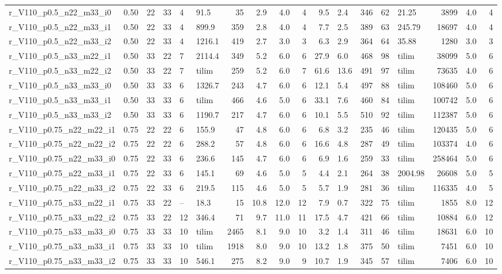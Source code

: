 \begin{tabular}{lrrrllrrrrrlrllrrr}
r_V110_p0.5_n22_m33_i0 & 0.50 & 22 & 33 & 4 & 91.5 & 35 & 2.9 & 4.0 & 4 & 9.5 & 2.4 & 346 & 62 & 21.25 & 3899 & 4.0 & 4 \\
r_V110_p0.5_n22_m33_i1 & 0.50 & 22 & 33 & 4 & 899.9 & 359 & 2.8 & 4.0 & 4 & 7.7 & 2.5 & 389 & 63 & 245.79 & 18697 & 4.0 & 4 \\
r_V110_p0.5_n22_m33_i2 & 0.50 & 22 & 33 & 4 & 1216.1 & 419 & 2.7 & 3.0 & 3 & 6.3 & 2.9 & 364 & 64 & 35.88 & 1280 & 3.0 & 3 \\
r_V110_p0.5_n33_m22_i1 & 0.50 & 33 & 22 & 7 & 2114.4 & 349 & 5.2 & 6.0 & 6 & 27.9 & 6.0 & 468 & 98 & tilim & 38099 & 5.0 & 6 \\
r_V110_p0.5_n33_m22_i2 & 0.50 & 33 & 22 & 7 & tilim & 259 & 5.2 & 6.0 & 7 & 61.6 & 13.6 & 491 & 97 & tilim & 73635 & 4.0 & 6 \\
r_V110_p0.5_n33_m33_i0 & 0.50 & 33 & 33 & 6 & 1326.7 & 243 & 4.7 & 6.0 & 6 & 12.1 & 5.4 & 497 & 88 & tilim & 108460 & 5.0 & 6 \\
r_V110_p0.5_n33_m33_i1 & 0.50 & 33 & 33 & 6 & tilim & 466 & 4.6 & 5.0 & 6 & 33.1 & 7.6 & 460 & 84 & tilim & 100742 & 5.0 & 6 \\
r_V110_p0.5_n33_m33_i2 & 0.50 & 33 & 33 & 6 & 1190.7 & 217 & 4.7 & 6.0 & 6 & 10.1 & 5.5 & 510 & 92 & tilim & 112387 & 5.0 & 6 \\
r_V110_p0.75_n22_m22_i1 & 0.75 & 22 & 22 & 6 & 155.9 & 47 & 4.8 & 6.0 & 6 & 6.8 & 3.2 & 235 & 46 & tilim & 120435 & 5.0 & 6 \\
r_V110_p0.75_n22_m22_i2 & 0.75 & 22 & 22 & 6 & 288.2 & 57 & 4.8 & 6.0 & 6 & 16.6 & 4.8 & 287 & 49 & tilim & 103374 & 4.0 & 6 \\
r_V110_p0.75_n22_m33_i0 & 0.75 & 22 & 33 & 6 & 236.6 & 145 & 4.7 & 6.0 & 6 & 6.9 & 1.6 & 259 & 33 & tilim & 258464 & 5.0 & 6 \\
r_V110_p0.75_n22_m33_i1 & 0.75 & 22 & 33 & 6 & 145.1 & 69 & 4.6 & 5.0 & 5 & 4.4 & 2.1 & 264 & 38 & 2004.98 & 26608 & 5.0 & 5 \\
r_V110_p0.75_n22_m33_i2 & 0.75 & 22 & 33 & 6 & 219.5 & 115 & 4.6 & 5.0 & 5 & 5.7 & 1.9 & 281 & 36 & tilim & 116335 & 4.0 & 5 \\
r_V110_p0.75_n33_m22_i1 & 0.75 & 33 & 22 & -- & 18.3 & 15 & 10.8 & 12.0 & 12 & 7.9 & 0.7 & 322 & 75 & tilim & 1855 & 8.0 & 12 \\
r_V110_p0.75_n33_m22_i2 & 0.75 & 33 & 22 & 12 & 346.4 & 71 & 9.7 & 11.0 & 11 & 17.5 & 4.7 & 421 & 66 & tilim & 10884 & 6.0 & 12 \\
r_V110_p0.75_n33_m33_i0 & 0.75 & 33 & 33 & 10 & tilim & 2465 & 8.1 & 9.0 & 10 & 3.2 & 1.4 & 311 & 46 & tilim & 18631 & 6.0 & 10 \\
r_V110_p0.75_n33_m33_i1 & 0.75 & 33 & 33 & 10 & tilim & 1918 & 8.0 & 9.0 & 10 & 13.2 & 1.8 & 375 & 50 & tilim & 7451 & 6.0 & 10 \\
r_V110_p0.75_n33_m33_i2 & 0.75 & 33 & 33 & 10 & 546.1 & 275 & 8.2 & 9.0 & 9 & 10.7 & 1.9 & 345 & 57 & tilim & 7406 & 6.0 & 10 \\
\bottomrule
\end{tabular}
